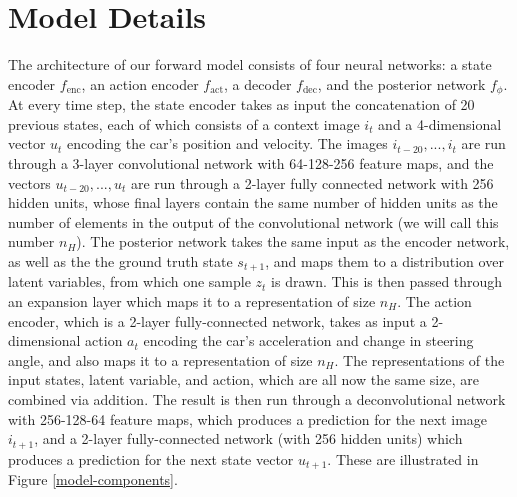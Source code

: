 \documentclass{article} %
\begin{document}
\section{Model Details}
\label{model-details}

The architecture of our forward model consists of four neural networks: a state encoder $f_\text{enc}$, an action encoder $f_\text{act}$, a decoder $f_\text{dec}$, and the posterior network $f_\phi$.
At every time step, the state encoder takes as input the concatenation of 20 previous states, each of which consists of a context image $i_t$ and a 4-dimensional vector $u_t$ encoding the car's position and velocity.
The images $i_{t-20}, ..., i_t$ are run through a 3-layer convolutional network with 64-128-256 feature maps, and the vectors $u_{t-20}, ..., u_t$ are run through a 2-layer fully connected network with 256 hidden units, whose final layers contain the same number of hidden units as the number of elements in the output of the convolutional network (we will call this number $n_H$).
The posterior network takes the same input as the encoder network, as well as the the ground truth state $s_{t+1}$, and maps them to a distribution over latent variables, from which one sample $z_t$ is drawn.
This is then passed through an expansion layer which maps it to a representation of size $n_H$.
The action encoder, which is a 2-layer fully-connected network, takes as input a 2-dimensional action $a_t$ encoding the car's acceleration and change in steering angle, and also maps it to a representation of size $n_H$.
The representations of the input states, latent variable, and action, which are all now the same size, are combined via addition.
The result is then run through a deconvolutional network with 256-128-64 feature maps, which produces a prediction for the next image $i_{t+1}$, and a 2-layer fully-connected network (with 256 hidden units) which produces a prediction for the next state vector $u_{t+1}$. These are illustrated in Figure \ref{model-components}.
\end{document}
